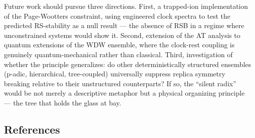 \documentclass[
]{article}
\begin{document}
Future work should pursue three directions. First, a trapped-ion
implementation of the Page-Wootters constraint, using engineered clock
spectra to test the predicted RS-stability as a null result --- the
absence of RSB in a regime where unconstrained systems would show it.
Second, extension of the AT analysis to quantum extensions of the WDW
ensemble, where the clock-rest coupling is genuinely quantum-mechanical
rather than classical. Third, investigation of whether the principle
generalizes: do other deterministically structured ensembles (p-adic,
hierarchical, tree-coupled) universally suppress replica symmetry
breaking relative to their unstructured counterparts? If so, the
``silent radix'' would be not merely a descriptive metaphor but a
physical organizing principle --- the tree that holds the glass at bay.

\subsection{References}\label{references}
\end{document}
